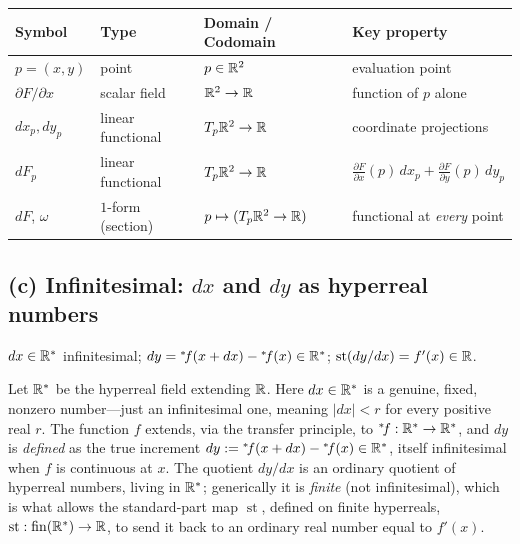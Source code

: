 \documentclass{essay}
\begin{document}
\begin{center}
  \small
  \renewcommand{\arraystretch}{1.35}
  \begin{tabular}{@{}l l l l@{}}
    \toprule
    \textbf{Symbol} & \textbf{Type} & \textbf{Domain / Codomain} & \textbf{Key property} \\
    \midrule
    \(p=(x,y)\) & point            & \(p \in \mathbb{R}^{2}\)                        & evaluation point \\
    \(\partial F/\partial x\) & scalar field & \(\mathbb{R}^{2} \to \mathbb{R}\)                 & function of \(p\) alone \\
    \(dx_{p}, dy_{p}\) & linear functional & \(T_{p}\mathbb{R}^{2} \to \mathbb{R}\)                & coordinate projections \\
    \(dF_{p}\)    & linear functional & \(T_{p}\mathbb{R}^{2} \to \mathbb{R}\)                   & \(\tfrac{\partial F}{\partial x}(p)\,dx_{p} + \tfrac{\partial F}{\partial y}(p)\,dy_{p}\) \\
    \(dF\), \(\omega\) & \(1\)-form (section) & \(p \mapsto (T_{p}\mathbb{R}^{2} \to \mathbb{R})\) & functional at \emph{every} point \\
    \bottomrule
  \end{tabular}
\end{center}

\subsection*{(c) Infinitesimal: \(dx\) and \(dy\) as hyperreal numbers}

\begin{signature}
  \(dx \in \mathbb{R}^*\) infinitesimal; \quad \(dy = {}^*\!f(x+dx) - {}^*\!f(x) \in \mathbb{R}^*\); \quad \(\operatorname{st}(dy/dx) = f'(x) \in \mathbb{R}\).
\end{signature}

Let \(\mathbb{R}^*\) be the hyperreal field extending \(\mathbb{R}\). Here \(dx \in \mathbb{R}^*\) is a genuine, fixed, nonzero number---just an infinitesimal one, meaning \(\lvert dx\rvert < r\) for every positive real \(r\). The function \(f\) extends, via the transfer principle, to \({}^*\!f : \mathbb{R}^* \to \mathbb{R}^*\), and \(dy\) is \emph{defined} as the true increment \(dy := {}^*\!f(x+dx) - {}^*\!f(x) \in \mathbb{R}^*\), itself infinitesimal when \(f\) is continuous at \(x\). The quotient \(dy/dx\) is an ordinary quotient of hyperreal numbers, living in \(\mathbb{R}^*\); generically it is \emph{finite} (not infinitesimal), which is what allows the standard-part map \(\operatorname{st}\), defined on finite hyperreals, \(\operatorname{st} : \mathrm{fin}(\mathbb{R}^*) \to \mathbb{R}\), to send it back to an ordinary real number equal to \(f'(x)\).
\end{document}
